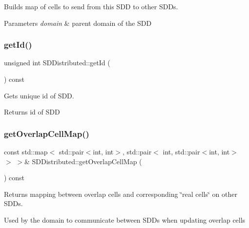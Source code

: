 Builds map of cells to send from this S\+DD to other S\+D\+Ds. 


\begin{DoxyParams}{Parameters}
{\em domain} & parent domain of the S\+DD \\
\hline
\end{DoxyParams}
\mbox{\label{classSDDistributed_a0ab71d942dca319b739390055942a96a}} 
\subsubsection{\texorpdfstring{get\+Id()}{getId()}}
{\footnotesize\ttfamily unsigned int S\+D\+Distributed\+::get\+Id (\begin{DoxyParamCaption}{ }\end{DoxyParamCaption}) const}



Gets unique id of S\+DD. 

\begin{DoxyReturn}{Returns}
id of S\+DD 
\end{DoxyReturn}
\mbox{\label{classSDDistributed_a2a2e744edad326561e3555a352ce4a0a}} 
\subsubsection{\texorpdfstring{get\+Overlap\+Cell\+Map()}{getOverlapCellMap()}}
{\footnotesize\ttfamily const std\+::map$<$ std\+::pair$<$int, int$>$, std\+::pair$<$ int, std\+::pair$<$int, int$>$ $>$ $>$\& S\+D\+Distributed\+::get\+Overlap\+Cell\+Map (\begin{DoxyParamCaption}{ }\end{DoxyParamCaption}) const}



Returns mapping between overlap cells and corresponding \char`\"{}real cells\char`\"{} on other S\+D\+Ds. 

Used by the domain to communicate between S\+D\+Ds when updating overlap cells \mbox{\label{classSDDistributed_a14f296606ff1afa1e4878fa6c4928afc}} 
